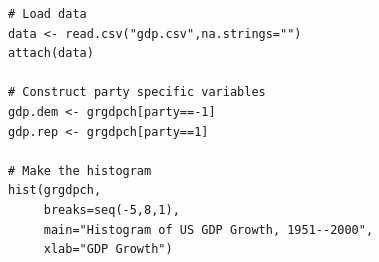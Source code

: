 \documentclass[pdflatex,landscape,titlepage]{foils}
\begin{document}

\begin{verbatim}
# Load data
data <- read.csv("gdp.csv",na.strings="")
attach(data)

# Construct party specific variables
gdp.dem <- grgdpch[party==-1]
gdp.rep <- grgdpch[party==1]

# Make the histogram
hist(grgdpch,
     breaks=seq(-5,8,1),
     main="Histogram of US GDP Growth, 1951--2000",
     xlab="GDP Growth")

\end{verbatim}


\foilhead[-0.75in]{}
\bgclear
{}
\end{document}
